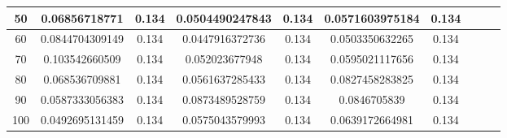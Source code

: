 \documentclass[a4paper,10pt]{article}
\begin{document}
{\begin{tabular}{|c|c|c|c|c|c|c|c|c|c|}
50 & 0.06856718771 & 0.134& 0.0504490247843 & 0.134& 0.0571603975184 & 0.134 \\                                                                                                                                                                                                    
 \hline                                                                                                                                                                                                                                                                              
60 & 0.0844704309149 & 0.134& 0.0447916372736 & 0.134& 0.0503350632265 & 0.134 \\                                                                                                                                                                                                  
  \hline                                                                                                                                                                                                                                                                             
70 & 0.103542660509 & 0.134& 0.052023677948 & 0.134& 0.0595021117656 & 0.134 \\                                                                                                                                                                                                    
   \hline                                                                                                                                                                                                                                                                            
80 & 0.068536709881 & 0.134& 0.0561637285433 & 0.134& 0.0827458283825 & 0.134 \\                                                                                                                                                                                                   
   \hline                                                                                                                                                                                                                                                                            
90 & 0.0587333056383 & 0.134& 0.0873489528759 & 0.134& 0.0846705839 & 0.134 \\                                                                                                                                                                                                     
   \hline                                                                                                                                                                                                                                                                            
100 & 0.0492695131459 & 0.134& 0.0575043579993 & 0.134& 0.0639172664981 & 0.134 \\
\hline 
\end{tabular}%
}
\end{document}

